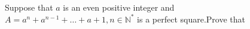 Suppose that $a$ is an even positive integer and $A=a^{n}+a^{n-1}+\ldots +a+1,n\in \mathbb{N^{*}}$ is a perfect square.Prove that 